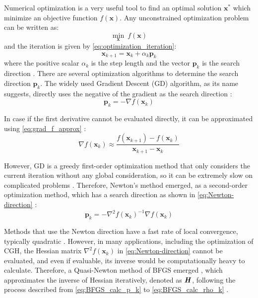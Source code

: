 Numerical optimization is a very useful tool to find an optimal solution $\textbf{x}^*$ which minimize an objective function $f(\textbf{x})$. Any unconstrained optimization problem can be written as:
\begin{equation}
	\underset{\textbf{x}}{\min}\ f(\textbf{x})
	\label{eq:minimise_F}
\end{equation}
and the iteration is given by \cref{eq:optimization_iteration}:
\begin{equation}
	\textbf{x}_{k+1} = \textbf{x}_k+\alpha_k \textbf{p}_k
	\label{eq:optimization_iteration}
\end{equation}
where the positive scalar $\alpha_k$ is the step length and the vector $\textbf{p}_k$ is the search direction \cite{Nocedal2006}. There are several optimization algorithms to determine the search direction $\textbf{p}_k$. The widely used Gradient Descent (GD) algorithm, as its name suggests, directly uses the negative of the gradient as the search direction \cite{GD_REF}:
\begin{equation}
	\textbf{p}_k = -\nabla f(\textbf{x}_k)
\end{equation}

In case if the first derivative cannot be evaluated directly, it can be approximated using \cref{eq:grad_f_approx} \cite{Nocedal2006}:
\begin{equation}
	\nabla f(\textbf{x}_k) \approx \frac{f(\textbf{x}_{k+1})-f(\textbf{x}_{k})}{\textbf{x}_{k+1}-\textbf{x}_{k}}
	\label{eq:grad_f_approx}
\end{equation}

However, GD is a greedy first-order optimization method that only considers the current iteration without any global consideration, so it can be extremely slow on complicated problems \cite{Nocedal2006}. Therefore, Newton's method emerged, as a second-order optimization method, which has a search direction as shown in \cref{eq:Newton-direction} \cite{Fletcher1987}:
\begin{equation}
	\textbf{p}_k=-\nabla^2 f(\textbf{x}_k)^{-1}\nabla f(\textbf{x}_k)
	\label{eq:Newton-direction}
\end{equation}

Methods that use the Newton direction have a fast rate of local convergence, typically quadratic \cite{Nocedal2006}. However, in many applications, including the optimization of CGH, the Hessian matrix $\nabla^2 f(\textbf{x}_k)$ in \cref{eq:Newton-direction} cannot be evaluated, and even if evaluable, its inverse would be computationally heavy to calculate. Therefore, a Quasi-Newton method of BFGS emerged \cite{Fletcher1987}, which approximates the inverse of Hessian iteratively, denoted as $\textbf{\textit{H}}$, following the process described from \cref{eq:BFGS_calc_p_k} to \cref{eq:BFGS_calc_rho_k} \cite{Nocedal2006}.

